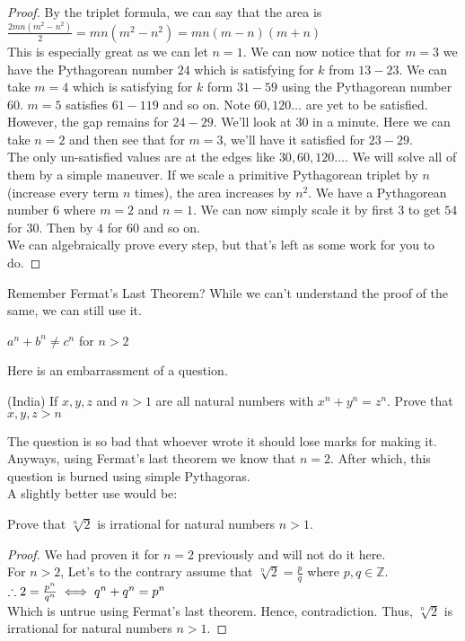\begin{proof}
    By the triplet formula, we can say that the area is $\frac{2mn(m^2-n^2)}{2}=mn(m^2-n^2)=mn(m-n)(m+n)$\\
    This is especially great as we can let $n=1$. We can now notice that for $m=3$ we have the Pythagorean number $24$ which is satisfying for $k$ from $13-23$. We can take $m=4$ which is satisfying for $k$ form $31-59$ using the Pythagorean number $60$. $m=5$ satisfies $61-119$ and so on. Note $60,120 \dots$ are yet to be satisfied.\\
    However, the gap remains for $24-29$. We'll look at $30$ in a minute. Here we can take $n=2$ and then see that for $m=3$, we'll have it satisfied for $23-29$.\\
    The only un-satisfied values are at the edges like $30,60,120 \dots$. We will solve all of them by a simple maneuver. If we scale a primitive Pythagorean triplet by $n$(increase every term $n$ times), the area increases by $n^2$.  We have a Pythagorean number $6$ where $m=2$ and $n=1$. We can now simply scale it by first $3$ to get $54$ for $30$. Then by $4$ for $60$ and so on.\\
    We can algebraically prove every step, but that's left as some work for you to do.
\end{proof}
Remember Fermat's Last Theorem? While we can't understand the proof of the same, we can still use it.\\
\begin{theorem}
    $a^n+b^n \neq c^n$ for $n>2$
\end{theorem}
Here is an embarrassment of a question.\\
\begin{example}
(India)
    If $x,y,z$ and $n>1$ are all natural numbers with $x^n+y^n=z^n$. Prove that $x,y,z>n$
\end{example}
The question is so bad that whoever wrote it should lose marks for making it.\\
Anyways, using Fermat's last theorem we know that $n=2$. After which, this question is burned using simple Pythagoras.\\
A slightly better use would be:\\
\begin{example}
    Prove that $\sqrt[n]{2}$ is irrational for natural numbers $n>1$.
\end{example}
\begin{proof}
    We had proven it for $n=2$ previously and will not do it here.\\
    For $n>2$, Let's to the contrary assume that $\sqrt[n]{2}=\frac{p}{q}$ where $p,q \in \mathbb{Z}$.\\
    $\therefore 2=\frac{p^n}{q^n}\\
    \iff q^n + q^n = p^n$\\
    Which is untrue using Fermat's last theorem. Hence, contradiction. Thus, $\sqrt[n]{2}$ is irrational for natural numbers $n>1$.
\end{proof}
